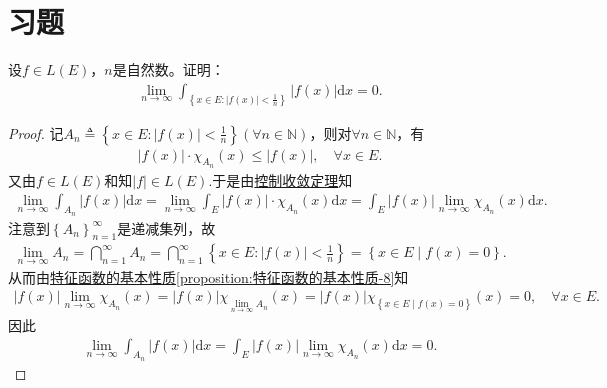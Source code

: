 \documentclass[../../main.tex]{subfiles}%
\begin{document}
\section{习题}

\begin{example}
设$f\in L(E)$，$n$是自然数。证明：
\begin{align*}
\lim\limits_{n\rightarrow \infty}\int_{\left\{ x\in E:\left| f\left( x \right) \right|<\frac{1}{n} \right\}}\left| f\left( x \right) \right|\mathrm{d}x=0.
\end{align*}
\end{example}
\begin{proof}
记$A_n\triangleq \left\{ x\in E:\left| f\left( x \right) \right|<\frac{1}{n} \right\}\left( \forall n\in \mathbb{N} \right)$，则对$\forall n\in \mathbb{N}$，有
\begin{align*}
\left| f\left( x \right) \right|\cdot \chi _{A_n}\left( x \right) \leqslant \left| f\left( x \right) \right|,\quad \forall x\in E.
\end{align*}
又由$f\in L\left( E \right)$和知$\left| f \right|\in L\left( E \right)$.于是由\hyperref[theorem:控制收敛定理]{控制收敛定理}知
\begin{align*}
\lim\limits_{n\rightarrow \infty}\int_{A_n}{\left| f\left( x \right) \right|\mathrm{d}x}=\lim\limits_{n\rightarrow \infty}\int_E{\left| f\left( x \right) \right|\cdot \chi _{A_n}\left( x \right) \mathrm{d}x}=\int_E{\left| f\left( x \right) \right|\lim\limits_{n\rightarrow \infty}\chi _{A_n}\left( x \right) \mathrm{d}x}.
\end{align*}
注意到$\left\{ A_n \right\} _{n=1}^{\infty}$是递减集列，故
\begin{align*}
\lim\limits_{n\rightarrow \infty}A_n=\bigcap\limits_{n=1}^{\infty}{A_n}=\bigcap\limits_{n=1}^{\infty}{\left\{ x\in E:\left| f\left( x \right) \right|<\frac{1}{n} \right\}}=\left\{ x\in E\mid f\left( x \right) =0 \right\}.
\end{align*}
从而由\hyperref[Set Theory-proposition:特征函数的基本性质-8]{特征函数的基本性质\ref{proposition:特征函数的基本性质-8}}知
\begin{align*}
\left| f\left( x \right) \right|\lim\limits_{n\rightarrow \infty}\chi _{A_n}\left( x \right) =\left| f\left( x \right) \right|\chi _{\lim\limits_{n\rightarrow \infty}A_n}\left( x \right) =\left| f\left( x \right) \right|\chi _{\left\{ x\in E\mid f\left( x \right) =0 \right\}}\left( x \right) =0,\quad \forall x\in E.
\end{align*}
因此
\begin{align*}
\lim\limits_{n\rightarrow \infty}\int_{A_n}{\left| f\left( x \right) \right|\mathrm{d}x}=\int_E{\left| f\left( x \right) \right|\lim\limits_{n\rightarrow \infty}\chi _{A_n}\left( x \right) \mathrm{d}x}=0.
\end{align*}
\end{proof}
\end{document}
